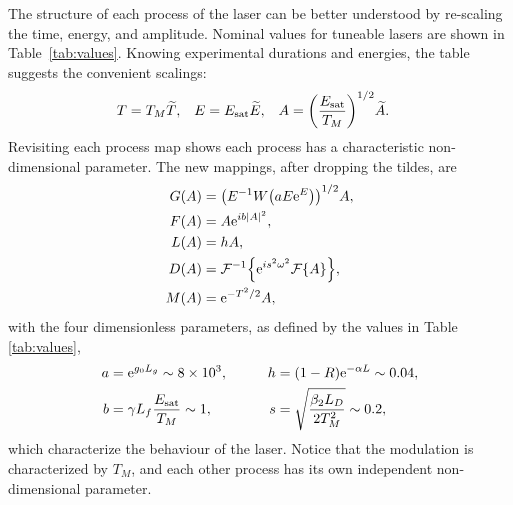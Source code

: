 The structure of each process of the laser can be better understood by re-scaling the time, energy, and amplitude. Nominal values for tuneable lasers are shown in Table~\ref{tab:values}. Knowing experimental durations and energies, the table suggests the convenient scalings:
\begin{align}
	T &= T_M \widetilde{T},& E &= \Es \widetilde{E},& A &= \left( \frac{\Es}{T_M} \right)^{1/2} \widetilde{A}.
\end{align}
Revisiting each process map shows each process has a characteristic non-dimensional parameter. The new mappings, after dropping the tildes, are
\begin{subequations}
\label{eq:effects}
\begin{align}
\label{eq:gain}
G(A) &= \left(E^{-1} W \left( a E \textrm{e}^{E}\right) \right)^{1/2} A, \\
\label{eq:fibre}
F(A) &= A \textrm{e}^{i b |A|^2}, \\
\label{eq:loss}
L(A) &= h A, \\
\label{eq:disp}
D(A) &= \FTi{\textrm{e}^{i s^2 \omega^2} \FT{A}}, \\
\label{eq:mod}
M(A) &= \textrm{e}^{-T^2 / 2} A,
\end{align}
\end{subequations}
with the four dimensionless parameters, as defined by the values in Table \ref{tab:values},
\begin{equation}
\begin{aligned}
	a &= \textrm{e}^{g_0 L_g} \sim 8 \times 10^3,& \qquad h &= (1 - R) \textrm{e}^{-\alpha L} \sim 0.04, \\
	b &= \gamma L_f \frac{E_{\textrm{sat}}}{T_M} \sim 1,& \qquad s &= \sqrt{\frac{\beta_2 L_D}{2 T_M^2}} \sim 0.2,
\label{eq:ndparam}
\end{aligned}
\end{equation}
which characterize the behaviour of the laser. Notice that the modulation is characterized by $T_M$, and each other process has its own independent non-dimensional parameter.

